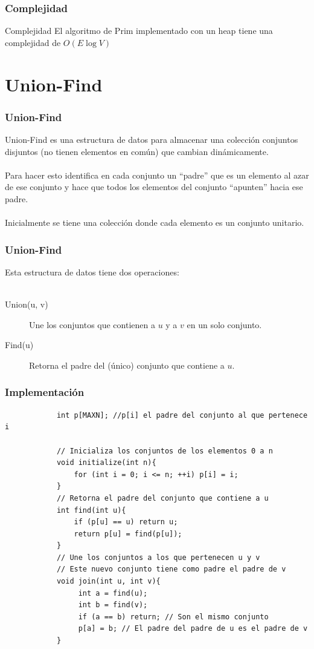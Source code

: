 \documentclass{beamer}
\begin{document}
	\begin{frame}
		\frametitle{Complejidad}
		\begin{block}{Complejidad}
			El algoritmo de Prim implementado con un heap tiene una complejidad de $O(E\operatorname{log} V)$
		\end{block}
	\end{frame}

\section[Union-Find]{Union-Find}
	\begin{frame}[fragile]
		\frametitle{Union-Find}
		Union-Find es una estructura de datos para almacenar una colección conjuntos disjuntos (no tienen elementos en común) que cambian dinámicamente. \\ \quad \\
		Para hacer esto identifica en cada conjunto un ``padre'' que es un elemento al azar de ese conjunto y hace que todos los elementos del conjunto ``apunten'' hacia ese padre. \\ \quad \\
		Inicialmente se tiene una colección donde cada elemento es un conjunto unitario.
	\end{frame}
	
	\begin{frame}
		\frametitle{Union-Find}
		Esta estructura de datos tiene dos operaciones: \\ \quad \\
		\begin{description}
			\item[Union(u, v)] Une los conjuntos que contienen a $u$ y a $v$ en un solo conjunto.
			\item[Find(u)] Retorna el padre del (único) conjunto que contiene a $u$.
		\end{description}
	\end{frame}
	
	\begin{frame}[fragile]
		\frametitle{Implementación}
		\begin{lstlisting}
			int p[MAXN]; //p[i] el padre del conjunto al que pertenece i
			
			// Inicializa los conjuntos de los elementos 0 a n
			void initialize(int n){
			    for (int i = 0; i <= n; ++i) p[i] = i;
			}
			// Retorna el padre del conjunto que contiene a u
			int find(int u){
			    if (p[u] == u) return u;
			    return p[u] = find(p[u]);
			}
			// Une los conjuntos a los que pertenecen u y v
			// Este nuevo conjunto tiene como padre el padre de v
			void join(int u, int v){
			     int a = find(u);
			     int b = find(v);
			     if (a == b) return; // Son el mismo conjunto
			     p[a] = b; // El padre del padre de u es el padre de v
			}
		\end{lstlisting}
	\end{frame}
	
\end{document}
